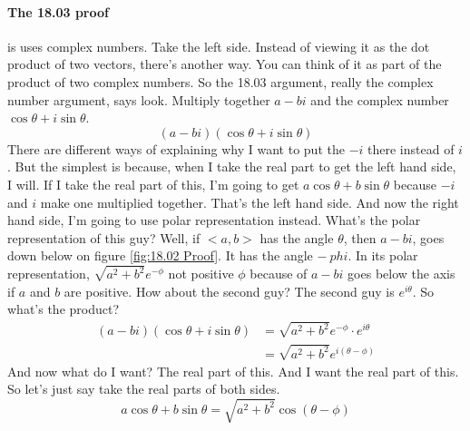 \paragraph{The 18.03 proof} is uses complex numbers.
Take the left side. Instead of viewing it as the dot product of two vectors,
there's another way.
You can think of it as part of the product of two complex numbers.
So the 18.03 argument, really the complex number argument, says look.
Multiply together $a -bi$ and the complex number $\cos \theta + i \sin \theta$.
\begin{equation*}
  (a - bi)(\cos \theta + i \sin \theta)
\end{equation*}
There are different ways of explaining why I want to put the $-i$ there instead of $i$.
But the simplest is because, when I take the real part to get the left hand side, I will.
If I take the real part of this, I'm going to get $a \cos \theta + b \sin \theta$
because $-i$ and $i$ make one multiplied together.
That's the left hand side. And now the right hand side, I'm going
to use polar representation instead. What's the polar representation of this guy?
Well, if $<a, b>$ has the angle $\theta$, then $a -bi$, goes down below on figure \ref{fig:18.02 Proof}.
It has the angle $- \ phi$. 
In its polar representation, $\sqrt{a^2 + b^2} e^{-\phi}$ not positive $\phi$
because of $a -bi$ goes below the axis if $a$ and $b$ are positive.
How about the second guy?
The second guy is $e^{i \theta}$. 
So what's the product?
\begin{align*}
  (a - bi)(\cos \theta + i \sin \theta) &= \sqrt{a^2 + b^2} e^{-\phi} \cdot e^{i \theta}\\
  &= \sqrt{a^2 + b^2} e^{i(\theta - \phi)}
\end{align*}
And now what do I want? The real part of this.
And I want the real part of this.
So let's just say take the real parts of both sides.
\begin{equation*}
  a \cos \theta + b \sin \theta = \sqrt{a^2 + b^2} \cos(\theta - \phi)
\end{equation*}



